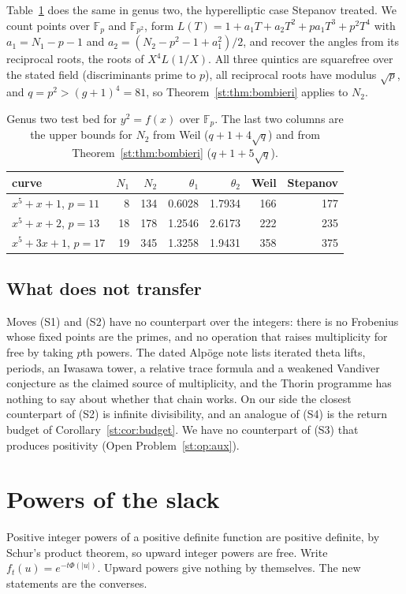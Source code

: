 Table~\ref{st:tab:genus2} does the same in genus two, the hyperelliptic case Stepanov treated. We count points over $\mathbb F_p$ and $\mathbb F_{p^2}$, form $L(T)=1+a_1T+a_2T^2+pa_1T^3+p^2T^4$ with $a_1=N_1-p-1$ and $a_2=(N_2-p^2-1+a_1^2)/2$, and recover the angles from its reciprocal roots, the roots of $X^4L(1/X)$. All three quintics are squarefree over the stated field (discriminants prime to $p$), all reciprocal roots have modulus $\sqrt p$, and $q=p^2>(g+1)^4=81$, so Theorem~\ref{st:thm:bombieri} applies to $N_2$.
\begin{table}[h]\centering\small
\begin{tabular}{lrrrrrr}
\toprule
curve & $N_1$ & $N_2$ & $\theta_1$ & $\theta_2$ & Weil & Stepanov\\
\midrule
$x^5+x+1$, $p=11$ & 8 & 134 & 0.6028 & 1.7934 & 166 & 177\\
$x^5+x+2$, $p=13$ & 18 & 178 & 1.2546 & 2.6173 & 222 & 235\\
$x^5+3x+1$, $p=17$ & 19 & 345 & 1.3258 & 1.9431 & 358 & 375\\
\bottomrule
\end{tabular}
\caption{Genus two test bed for $y^2=f(x)$ over $\mathbb F_p$. The last two columns are the upper bounds for $N_2$ from Weil ($q+1+4\sqrt q$) and from Theorem~\ref{st:thm:bombieri} ($q+1+5\sqrt q$).}\label{st:tab:genus2}
\end{table}

\subsection{What does not transfer}
Moves (S1) and (S2) have no counterpart over the integers: there is no Frobenius whose fixed points are the primes, and no operation that raises multiplicity for free by taking $p$th powers. The dated Alp\"oge note lists iterated theta lifts, periods, an Iwasawa tower, a relative trace formula and a weakened Vandiver conjecture as the claimed source of multiplicity, and the Thorin programme has nothing to say about whether that chain works. On our side the closest counterpart of (S2) is infinite divisibility, and an analogue of (S4) is the return budget of Corollary~\ref{st:cor:budget}. We have no counterpart of (S3) that produces positivity (Open Problem~\ref{st:op:aux}).

\section{Powers of the slack}\label{st:sec:powers}
Positive integer powers of a positive definite function are positive definite, by Schur's product theorem, so upward integer powers are free. Write $f_t(u)=e^{-t\Phi(|u|)}$. Upward powers give nothing by themselves. The new statements are the converses.

